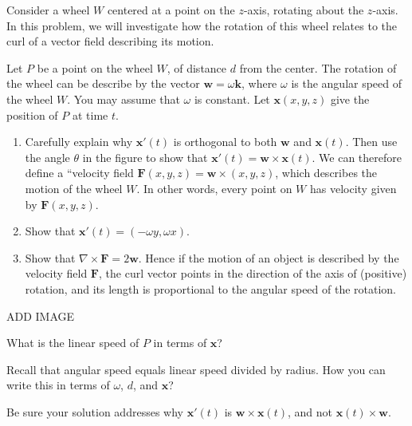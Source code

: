 \documentclass{ximera}
\begin{document}
\begin{problem}
Consider a wheel $W$ centered at a point on the $z$-axis, rotating about the $z$-axis. In this problem, we will investigate how the rotation of this wheel relates to the curl of a vector field describing its motion.

Let $P$ be a point on the wheel $W$, of distance $d$ from the center. The rotation of the wheel can be describe by the vector $\mathbf{w}=\omega\mathbf{k}$, where $\omega$ is the angular speed of the wheel $W$. You may assume that $\omega$ is constant. Let $\mathbf{x}(x,y,z)$ give the position of $P$ at time $t$.

\begin{enumerate}
\item Carefully explain why $\mathbf{x}'(t)$ is orthogonal to both $\mathbf{w}$ and $\mathbf{x}(t)$. Then use the angle $\theta$ in the figure to show that $\mathbf{x}'(t) = \mathbf{w}\times\mathbf{x}(t)$. We can therefore define a ``velocity field $\mathbf{F}(x,y,z) = \mathbf{w}\times(x,y,z)$, which describes the motion of the wheel $W$. In other words, every point on $W$ has velocity given by $\mathbf{F}(x,y,z)$.
\item Show that $\mathbf{x}'(t) = (-\omega y, \omega x)$.
\item Show that $\nabla\times\mathbf{F} = 2\mathbf{w}$. Hence if the motion of an object is described by the velocity field $\mathbf{F}$, the curl vector points in the direction of the axis of (positive) rotation, and its length is proportional to the angular speed of the rotation.
\end{enumerate}

ADD IMAGE

\begin{hint}
What is the linear speed of $P$ in terms of $\mathbf{x}$?

Recall that angular speed equals linear speed divided by radius. How you can write this in terms of $\omega$, $d$, and $\mathbf{x}$?

Be sure your solution addresses why $\mathbf{x}'(t)$ is $\mathbf{w}\times\mathbf{x}(t)$, and not $\mathbf{x}(t)\times\mathbf{w}$.
\end{hint}
\end{problem}
\end{document}

